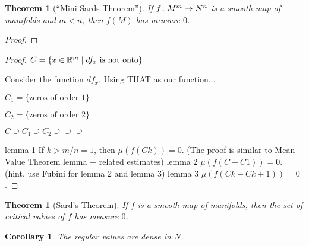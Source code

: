 \documentclass[11pt]{amsbook}
\theoremstyle{mystyle} %
\newtheorem{thrm}[thm]{Theorem}
\newtheorem{coro}[thm]{Corollary}
\numberwithin{thm}{section}
\begin{document}
\begin{thrm}[``Mini Sards Theorem'']
	If $f \colon M^m \to N^n$ is a smooth map of manifolds and $m < n$, then $f(M)$ has measure $0$.
\end{thrm}
\begin{proof}














\end{proof}
\begin{proof}
	$C = \{ x \in {\mathbb R}^m \mid df_x \text{ is not onto} \}$

	Consider the function $df_x$.  Using THAT as our function...

	$C_1 = \{\text{zeros of order 1}\}$

	$C_2 = \{\text{zeros of order 2}\}$

	$C \supseteq C_1 \supseteq C_2 \supseteq \supseteq \supseteq$

	lemma 1
		If $k > m/n = 1$, then $\mu(f(Ck)) = 0$.
		(The proof is similar to Mean Value Theorem lemma + related estimates)
	lemma 2
		$\mu(f(C-C1)) = 0$.
		(hint, use Fubini for lemma 2 and lemma 3)
	lemma 3
		$\mu(f(Ck-C{k+1})) = 0$.
\end{proof}
\begin{thrm}[Sard's Theorem]
	If $f$ is a smooth map of manifolds, then the set of critical values of $f$ has measure $0$.
\end{thrm}
\begin{coro}
	The regular values are dense in $N$.
\end{coro}
\end{document}
